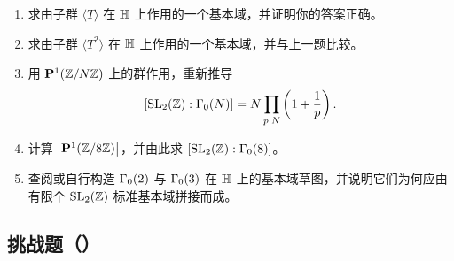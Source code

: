 \begin{enumerate}
  \item[\medium 46.] 求由子群 $\langle T\rangle$ 在 $\mathbb{H}$ 上作用的一个基本域，并证明你的答案正确。
  \item[\medium 47.] 求由子群 $\langle T^2\rangle$ 在 $\mathbb{H}$ 上作用的一个基本域，并与上一题比较。
  \item[\medium 48.] 用 $\mathbf{P}^1(\mathbb{Z}/N\mathbb{Z})$ 上的群作用，重新推导
  \[
  [\mathrm{SL}_2(\mathbb{Z}):\Gamma_0(N)]
  =N\prod_{p\mid N}\left(1+\frac1p\right).
  \]
  \item[\medium 49.] 计算 $\bigl|\mathbf{P}^1(\mathbb{Z}/8\mathbb{Z})\bigr|$，并由此求 $[\mathrm{SL}_2(\mathbb{Z}):\Gamma_0(8)]$。
  \item[\medium 50.] 查阅或自行构造 $\Gamma_0(2)$ 与 $\Gamma_0(3)$ 在 $\mathbb{H}$ 上的基本域草图，并说明它们为何应由有限个 $\mathrm{SL}_2(\mathbb{Z})$ 标准基本域拼接而成。
\end{enumerate}

\subsection*{挑战题（\hard）}

